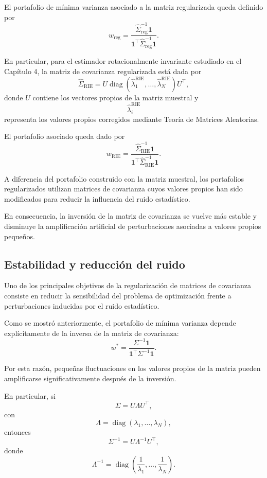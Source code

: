 \documentclass[letterpaper,12pt,oneside]{book}
\begin{document}
El portafolio de mínima varianza asociado a la matriz regularizada queda definido por
\[
w_{\mathrm{reg}}
=
\frac{
\widehat{\Sigma}_{\mathrm{reg}}^{-1}\mathbf{1}
}{
\mathbf{1}^\top
\widehat{\Sigma}_{\mathrm{reg}}^{-1}
\mathbf{1}
}.
\]

En particular, para el estimador rotacionalmente invariante estudiado en el Capítulo 4, la matriz de covarianza regularizada está dada por
\[
\widehat{\Sigma}_{\mathrm{RIE}}
=
U
\operatorname{diag}
\left(
\widehat{\lambda}_1^{\mathrm{RIE}},
\dots,
\widehat{\lambda}_N^{\mathrm{RIE}}
\right)
U^\top,
\]
donde \(U\) contiene los vectores propios de la matriz muestral y
\[
\widehat{\lambda}_i^{\mathrm{RIE}}
\]
representa los valores propios corregidos mediante Teoría de Matrices Aleatorias.

El portafolio asociado queda dado por
\[
w_{\mathrm{RIE}}
=
\frac{
\widehat{\Sigma}_{\mathrm{RIE}}^{-1}\mathbf{1}
}{
\mathbf{1}^\top
\widehat{\Sigma}_{\mathrm{RIE}}^{-1}
\mathbf{1}
}.
\]

A diferencia del portafolio construido con la matriz muestral, los portafolios regularizados utilizan matrices de covarianza cuyos valores propios han sido modificados para reducir la influencia del ruido estadístico.

En consecuencia, la inversión de la matriz de covarianza se vuelve más estable y disminuye la amplificación artificial de perturbaciones asociadas a valores propios pequeños.

\subsection{Estabilidad y reducción del ruido}

Uno de los principales objetivos de la regularización de matrices de covarianza consiste en reducir la sensibilidad del problema de optimización frente a perturbaciones inducidas por el ruido estadístico.

Como se mostró anteriormente, el portafolio de mínima varianza depende explícitamente de la inversa de la matriz de covarianza:
\[
w^*
=
\frac{
\Sigma^{-1}\mathbf{1}
}{
\mathbf{1}^\top
\Sigma^{-1}
\mathbf{1}
}.
\]

Por esta razón, pequeñas fluctuaciones en los valores propios de la matriz pueden amplificarse significativamente después de la inversión.

En particular, si
\[
\Sigma
=
U\Lambda U^\top,
\]
con
\[
\Lambda
=
\operatorname{diag}
(\lambda_1,\dots,\lambda_N),
\]
entonces
\[
\Sigma^{-1}
=
U\Lambda^{-1}U^\top,
\]
donde
\[
\Lambda^{-1}
=
\operatorname{diag}
\left(
\frac{1}{\lambda_1},
\dots,
\frac{1}{\lambda_N}
\right).
\]
\end{document}
